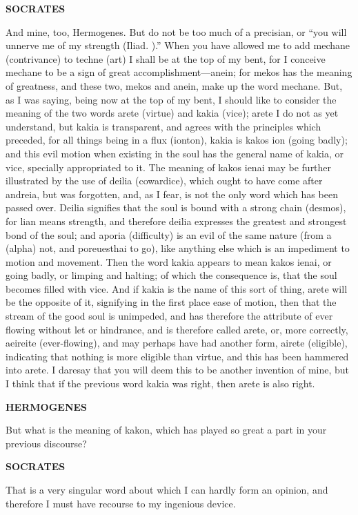 \documentclass[11pt,letter]{article}
\begin{document}
\par \textbf{SOCRATES}
\par   And mine, too, Hermogenes. But do not be too much of a precisian, or “you will unnerve me of my strength (Iliad. ).” When you have allowed me to add mechane (contrivance) to techne (art) I shall be at the top of my bent, for I conceive mechane to be a sign of great accomplishment—anein; for mekos has the meaning of greatness, and these two, mekos and anein, make up the word mechane. But, as I was saying, being now at the top of my bent, I should like to consider the meaning of the two words arete (virtue) and kakia (vice); arete I do not as yet understand, but kakia is transparent, and agrees with the principles which preceded, for all things being in a flux (ionton), kakia is kakos ion (going badly); and this evil motion when existing in the soul has the general name of kakia, or vice, specially appropriated to it. The meaning of kakos ienai may be further illustrated by the use of deilia (cowardice), which ought to have come after andreia, but was forgotten, and, as I fear, is not the only word which has been passed over. Deilia signifies that the soul is bound with a strong chain (desmos), for lian means strength, and therefore deilia expresses the greatest and strongest bond of the soul; and aporia (difficulty) is an evil of the same nature (from a (alpha) not, and poreuesthai to go), like anything else which is an impediment to motion and movement. Then the word kakia appears to mean kakos ienai, or going badly, or limping and halting; of which the consequence is, that the soul becomes filled with vice. And if kakia is the name of this sort of thing, arete will be the opposite of it, signifying in the first place ease of motion, then that the stream of the good soul is unimpeded, and has therefore the attribute of ever flowing without let or hindrance, and is therefore called arete, or, more correctly, aeireite (ever-flowing), and may perhaps have had another form, airete (eligible), indicating that nothing is more eligible than virtue, and this has been hammered into arete. I daresay that you will deem this to be another invention of mine, but I think that if the previous word kakia was right, then arete is also right.

\par \textbf{HERMOGENES}
\par   But what is the meaning of kakon, which has played so great a part in your previous discourse?

\par \textbf{SOCRATES}
\par   That is a very singular word about which I can hardly form an opinion, and therefore I must have recourse to my ingenious device.
\end{document}
